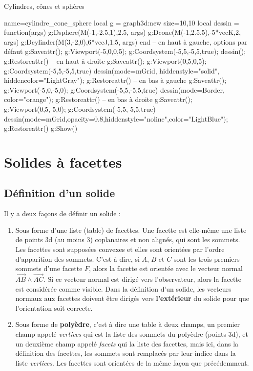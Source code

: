 \begin{demo}{Cylindres, cônes et sphères}
\begin{luadraw}{name=cylindre_cone_sphere}
local g = graph3d:new{ size={10,10} }
local dessin = function(args)
    g:Dsphere(M(-1,-2.5,1),2.5, args)
    g:Dcone(M(-1,2.5,5),-5*vecK,2, args)
    g:Dcylinder(M(3,-2,0),6*vecJ,1.5, args)
end
-- en haut à gauche, options par défaut
g:Saveattr(); g:Viewport(-5,0,0,5); g:Coordsystem(-5,5,-5,5,true); dessin(); g:Restoreattr()
-- en haut à droite
g:Saveattr(); g:Viewport(0,5,0,5); g:Coordsystem(-5,5,-5,5,true)
dessin({mode=mGrid, hiddenstyle="solid", hiddencolor="LightGray"}); g:Restoreattr()
-- en bas à gauche
g:Saveattr(); g:Viewport(-5,0,-5,0); g:Coordsystem(-5,5,-5,5,true)
dessin({mode=Border, color="orange"}); g:Restoreattr()
-- en bas à droite
g:Saveattr(); g:Viewport(0,5,-5,0); g:Coordsystem(-5,5,-5,5,true)
dessin({mode=mGrid,opacity=0.8,hiddenstyle="noline",color="LightBlue"}); g:Restoreattr()
g:Show()            
\end{luadraw}
\end{demo}

\section{Solides à facettes}

\subsection{Définition d'un solide}

Il y a deux façons de définir un solide :
\begin{enumerate}
    \item Sous forme d'une liste (table) de facettes. Une facette est elle-même une liste de points 3d (au moins 3) coplanaires et non alignés, qui sont les sommets. Les facettes sont supposées convexes et elles sont orientées par l'ordre d'apparition des sommets. C'est à dire, si $A$, $B$ et $C$ sont les trois premiers sommets d'une facette $F$, alors la facette est orientée avec le vecteur normal $\vec{AB}\wedge\vec{AC}$. Si ce vecteur normal est dirigé vers l'observateur, alors la facette est considérée comme visible. Dans la définition d'un solide, les vecteurs normaux aux facettes doivent être dirigés vers \textbf{l'extérieur} du solide pour que l'orientation soit correcte.
    
    \item Sous forme de \textbf{polyèdre}, c'est à dire une table à deux champs, un premier champ appelé \emph{vertices} qui est la liste des sommets du polyèdre (points 3d), et un deuxième champ appelé \emph{facets} qui la liste des facettes, mais ici, dans la définition des facettes, les sommets sont remplacés par leur indice dans la liste \emph{vertices}. Les facettes sont orientées de la même façon que précédemment.
\end{enumerate}

